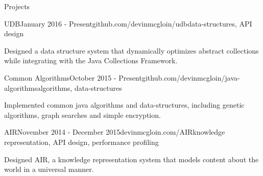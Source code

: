 \documentclass{resume} %
\begin{document}
\begin{rSection}{Projects}


\begin{rSubsection}{UDB}{January 2016 - Present}{github.com/devinmcgloin/udb}{data-structures, API design}
\item Designed a data structure system that dynamically optimizes abstract collections while integrating with the Java Collections Framework.
\end{rSubsection}


\begin{rSubsection}{Common Algorithms}{October 2015 - Present}{github.com/devinmcgloin/java-algorithms}{algorithms, data-structures}
\item Implemented common java algorithms and data-structures, including genetic algorithms, graph searches and simple encryption.
\end{rSubsection}





\begin{rSubsection}{AIR}{November 2014 - December 2015}{devinmcgloin.com/AIR}{knowledge representation, API design, performance profiling}
\item Designed AIR, a knowledge representation system that models content about the world in a universal manner.
\end{rSubsection}
\end{rSection}
\end{document}
